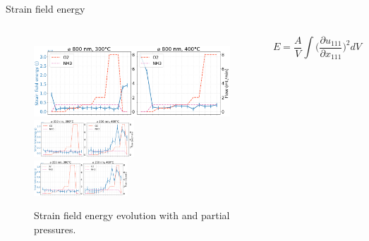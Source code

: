 \begin{frame}{Strain field energy}

    \begin{columns}

        \begin{figure}
            \centering
            \includegraphics[width=\textwidth]{Figures/bcdi_data/D6/strain_energy_D-6.png}
            {\includegraphics[width=0.51\textwidth, clip=True, trim=0 0 19.5cm 0]{Figures/bcdi_data/B7/strain_energy_B-7.png} }\hspace{-0.15cm}
            {\includegraphics[width=0.48\textwidth, clip=True, trim=20.9cm 0 0 0]{Figures/bcdi_data/B7/strain_energy_B-7.png}}
            \caption{Strain field energy evolution with \ammonia and \dioxygen partial pressures.}
        \end{figure}

        \begin{flushleft}
        \begin{equation*}
            E = \frac{A}{V} \int \Big( \frac{\partial u_{111}}{\partial x_{111}} \Big)^2dV %
        \end{equation*}
        \end{flushleft}
        
        \centering
        {}

    \end{columns}
    
\end{frame}


